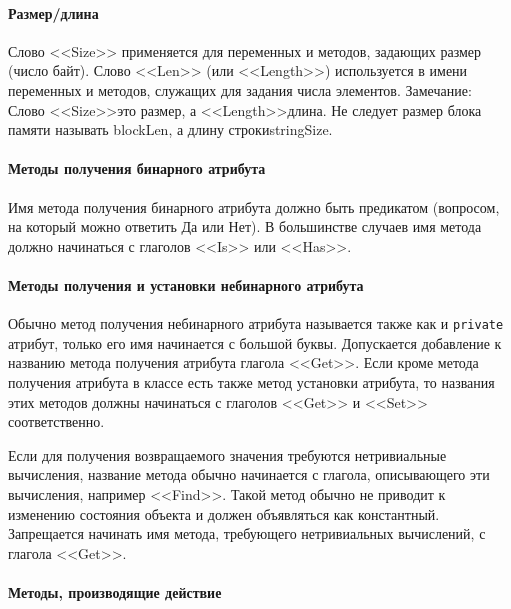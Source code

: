 \paragraph{Размер/длина}

Слово <<Size>> применяется для переменных и методов, задающих размер (число байт).
Слово <<Len>> (или <<Length>>) используется в имени переменных и методов, служащих для задания числа элементов.
Замечание: Слово <<Size>>\mdash это размер, а <<Length>>\mdash длина. Не следует размер блока памяти называть blockLen, а длину строки\mdash stringSize.

\paragraph{Методы получения бинарного атрибута}

Имя метода получения бинарного атрибута должно быть предикатом (вопросом, на который можно ответить Да или Нет). В большинстве случаев имя метода должно начинаться с глаголов <<Is>> или <<Has>>.

\paragraph{Методы получения и установки небинарного атрибута}

Обычно метод получения небинарного атрибута называется также как и \lstinline|private| атрибут, только его имя начинается с большой буквы. Допускается добавление к названию метода получения атрибута глагола <<Get>>. Если кроме метода получения атрибута в классе есть также метод установки атрибута, то названия этих методов должны начинаться с глаголов <<Get>> и <<Set>> соответственно.

Если для получения возвращаемого значения требуются нетривиальные вычисления, название метода обычно начинается с глагола, описывающего эти вычисления, например <<Find>>. Такой метод обычно не приводит к изменению состояния объекта и должен объявляться как константный. Запрещается начинать имя метода, требующего нетривиальных вычислений, с глагола <<Get>>.

\paragraph{Методы, производящие действие}

